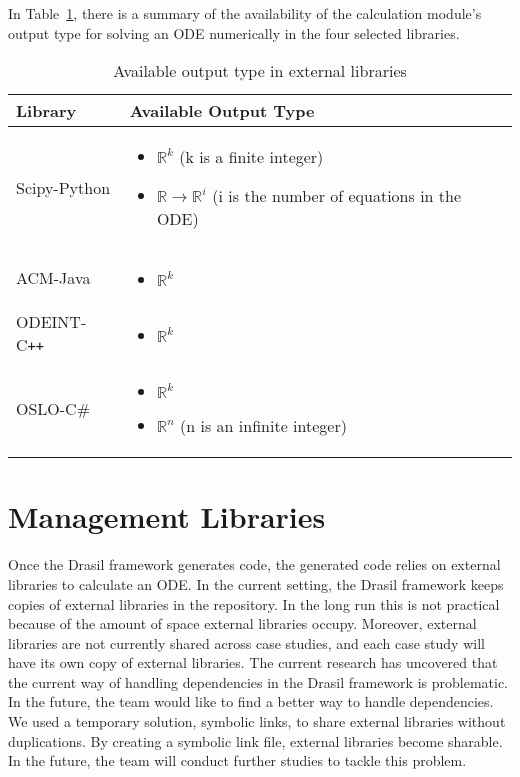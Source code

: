 In Table~\ref{tab_outputtype}, there is a summary of the availability of the calculation module's output type for solving an ODE numerically in the four selected libraries.
\begin{table}[ht]
\centering
\begin{tabular}{p{} | p{} } \hline
    \textbf{Library}&\textbf{Available Output Type}\\
    \toprule
    Scipy-Python & 
    \begin{itemize}[wide]
    \item $\mathbb{R}^k$ (k is a finite integer)
    \item $\mathbb{R} \rightarrow \mathbb{R}^i$ (i is the number of equations in the ODE)
    \end{itemize}  \\ \hline
    ACM-Java &     
    \begin{itemize}[wide]
    \item $\mathbb{R}^k$
    \end{itemize}  \\ \hline
    ODEINT-C\texttt{++} & 
    \begin{itemize}[wide]
    \item $\mathbb{R}^k$
    \end{itemize}\\ \hline
    OSLO-C\# & 
    \begin{itemize}[wide]
    \item $\mathbb{R}^k$
    \item $\mathbb{R}^n$ (n is an infinite integer)
    \end{itemize} \\
    \bottomrule	
\end{tabular}	
\caption{Available output type in external libraries}	
\label{tab_outputtype}
\end{table}

\section{Management Libraries}
Once the Drasil framework generates code, the generated code relies on external libraries to calculate an ODE. In the current setting, the Drasil framework keeps copies of external libraries in the repository. In the long run this is not practical because of the amount of space external libraries occupy. Moreover, external libraries are not currently shared across case studies, and each case study will have its own copy of external libraries. The current research has uncovered that the current way of handling dependencies in the Drasil framework is problematic. In the future, the team would like to find a better way to handle dependencies. We used a temporary solution, symbolic links, to share external libraries without duplications. By creating a symbolic link file, external libraries become sharable. In the future, the team will conduct further studies to tackle this problem.
